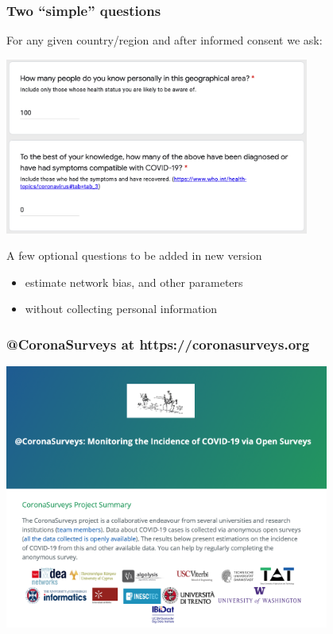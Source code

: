 \documentclass{beamer}
\begin{document}
\begin{frame}
  \frametitle{Two ``simple'' questions}
  For any given country/region and after informed consent we ask:
  \begin{center}
  \includegraphics[width=0.75\textwidth]{Questions.png}
  \end{center}
  A few optional questions to be added in new version
  \begin{itemize}
  \item estimate network bias, and other parameters 
  \item without collecting personal information
  \end{itemize}

\end{frame}
\begin{frame}
  \frametitle{@CoronaSurveys at https://coronasurveys.org}
  \begin{center}
  \includegraphics[width=0.8\textwidth]{CoronaSurveys.png}
  \end{center}
\end{frame}
\end{document}
